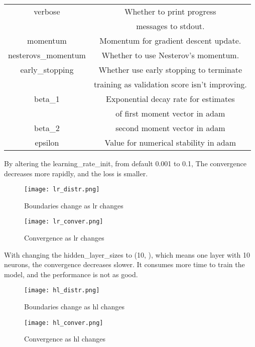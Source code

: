 \documentclass[10pt]{article}
\newcommand{\figsquish}{\vspace{-5mm}} %
\begin{document}
\begin{multicols*}{2}
\begin{table}[H]
\begin{tabular}{|c|c|}
        verbose & Whether to print progress \\ & messages to stdout.\\
        momentum & Momentum for gradient descent update. \\
        nesterovs\_momentum & Whether to use Nesterov's momentum. \\
        early\_stopping & Whether use early stopping to terminate \\ & training as validation score isn't improving.\\
        beta\_1 & Exponential decay rate for estimates\\ & of first moment vector in adam\\
        beta\_2 & second moment vector in adam\\
        epsilon & Value for numerical stability in adam\\
        \hline
    \end{tabular}
    \label{tab:Parameters}
\end{table}

By altering the learning\_rate\_init, from default 0.001 to 0.1, The convergence decreases more rapidly, and the loss is smaller. 

\figsquish
\begin{figure}[H]
    \centering
    \texttt{[image: lr\_distr.png]}
    \caption{Boundaries change as lr changes}
    \label{fig:lr_distr}
\end{figure}

\figsquish
\begin{figure}[H]
    \centering
    \texttt{[image: lr\_conver.png]}
    \caption{Convergence as lr changes}
    \label{fig:lr_conver}
\end{figure}

With changing the hidden\_layer\_sizes to (10, ), which means one layer with 10 neurons, the convergence decreases slower. It consumes more time to train the model, and the performance is not as good. 


\figsquish
\begin{figure}[H]
    \centering
    \texttt{[image: hl\_distr.png]}
    \caption{Boundaries change as hl changes}
    \label{fig:hl_distr}
\end{figure}

\figsquish
\begin{figure}[H]
    \centering
    \texttt{[image: hl\_conver.png]}
    \caption{Convergence as hl changes}
    \label{fig:hl_conver}
\end{figure}

\end{multicols*}

\nocite{*}



\end{document}
